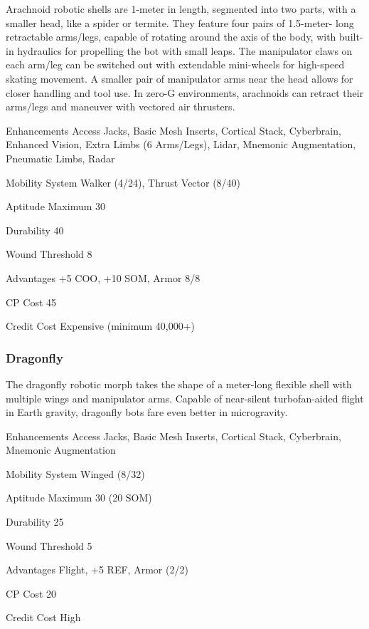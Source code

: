 Arachnoid robotic shells are 1-meter in length, segmented into two parts, with a smaller head, like a spider or termite. They feature four pairs of 1.5-meter- long retractable arms/legs, capable of rotating around the axis of the body, with built-in hydraulics for propelling the bot with small leaps. The manipulator claws on each arm/leg can be switched out with extendable mini-wheels for high-speed skating movement. A smaller pair of manipulator arms near the head allows for closer handling and tool use. In zero-G environments, arachnoids can retract their arms/legs and maneuver with vectored air thrusters.

\begin{description*}
\item[Enhancements] Access Jacks, Basic Mesh Inserts, Cortical Stack, Cyberbrain, Enhanced Vision, Extra Limbs (6 Arms/Legs), Lidar, Mnemonic Augmentation, Pneumatic Limbs, Radar
\item[Mobility System] Walker (4/24), Thrust Vector (8/40) 
\item[Aptitude Maximum] 30 
\item[Durability] 40 
\item[Wound Threshold] 8 
\item[Advantages] +5 COO, +10 SOM, Armor 8/8 
\item[CP Cost] 45 
\item[Credit Cost] Expensive (minimum 40,000+) 
\end{description*}

\subsubsection{Dragonfly}
\label{sec:starting-dragonfly}

The dragonfly robotic morph takes the shape of a meter-long flexible shell with multiple wings and manipulator arms. Capable of near-silent turbofan-aided flight in Earth gravity, dragonfly bots fare even better in microgravity.

\begin{description*}
\item[Enhancements] Access Jacks, Basic Mesh Inserts, Cortical Stack, Cyberbrain, Mnemonic Augmentation
\item[Mobility System] Winged (8/32) 
\item[Aptitude Maximum] 30 (20 SOM) 
\item[Durability] 25 
\item[Wound Threshold] 5 
\item[Advantages] Flight, +5 REF, Armor (2/2)
\item[CP Cost] 20 
\item[Credit Cost] High
\end{description*}

